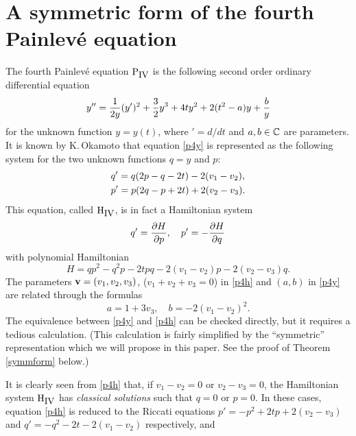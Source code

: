 \section{A symmetric form of the fourth Painlev\'e equation}
The fourth Painlev\'e equation $\mbox{P}_{\mbox{\small IV}}$ is the following
second order ordinary differential equation 
\begin{equation}
y''={1 \over 2 y}(y')^2+{3 \over 2} y^3+4 t y^2+2(t^2-a) y+
{b \over y}
\label{p4y}
\end{equation}
for the unknown function $y=y(t)$, 
where $'=d/dt$ and $a, b \in {\Bbb C}$ are 
parameters. 
It is known by K.\,Okamoto \cite{Ok} that equation \eqref{p4y} is represented 
as the following  system for the two unknown functions $q=y$ and $p$: 
\begin{equation}
\begin{align}
\label{p4h}
&q'=q(2p-q-2t)-2(v_1-v_2), \\
&p'=p(2q-p+2t)+2(v_2-v_3). \notag 
\end{align}
\end{equation}
This equation, called $\mbox{H}_{\mbox{\small IV}}$, 
is in fact a Hamiltonian system
\begin{equation}
q'={\partial H \over \partial p}, \quad
p'=-{\partial H \over \partial q}
\end{equation}
with polynomial Hamiltonian
\begin{equation}
H= q p^2-q^2 p-2 tpq-2(v_1-v_2)p-2(v_2-v_3) q. 
\label{hamiltonian}
\end{equation}
The parameters $\mbox{\bf v}=(v_1,v_2,v_3)$, ($v_1+v_2+v_3=0$) in \eqref{p4h} and $(a,
b)$ in \eqref{p4y} are related through the formulas 
\begin{equation}
a=1+3 v_3,\quad b=-2(v_1-v_2)^2. 
\label{parameter-ab}
\end{equation}
The equivalence between \eqref{p4y} and \eqref{p4h} can be checked 
directly, but it requires a tedious calculation. 
(This calculation is fairly simplified by the ``symmetric'' representation 
which we will propose in this paper. 
See the proof of Theorem \ref{symmform} below.)
\par
It is clearly seen from \eqref{p4h} that, if $v_1-v_2=0$ or $v_2-v_3=0$, 
the Hamiltonian system $\mbox{H}_{\mbox{\small IV}}$ 
has {\em classical solutions} such that 
$q=0$ or $p=0$. 
In these cases,  equation \eqref{p4h} is reduced to the Riccati equations 
$p'=-p^2+2tp+2(v_2-v_3)$ and $q'=-q^2-2t-2(v_1-v_2)$ respectively, and 
